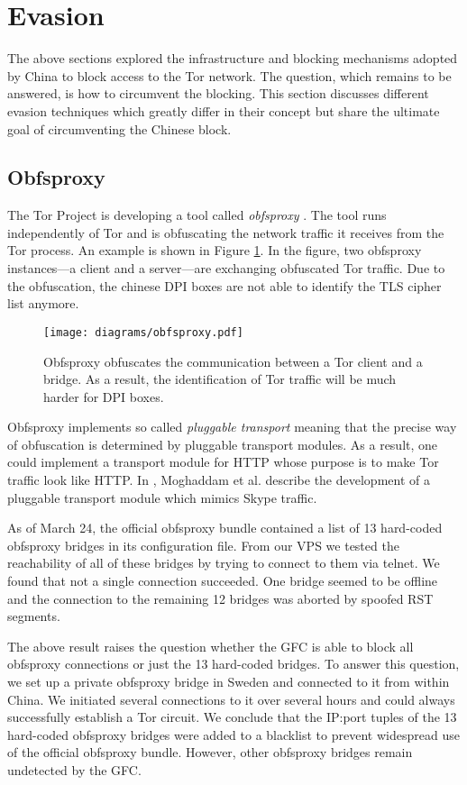 \documentclass[runningheads,a4paper]{llncs}
\begin{document}
\section{Evasion}
\label{sec:evasion}
The above sections explored the infrastructure and blocking mechanisms adopted by China to block
access to the Tor network. The question, which remains to be answered, is how to circumvent the
blocking. This section discusses different evasion techniques which greatly differ in their concept
but share the ultimate goal of circumventing the Chinese block.

\subsection{Obfsproxy}
The Tor Project is developing a tool called \emph{obfsproxy} \cite{obfsproxy}. The tool runs
independently of Tor and is obfuscating the network traffic it receives from the Tor process. An
example is shown in Figure \ref{fig:obfsproxy}. In the figure, two obfsproxy instances---a client
and a server---are exchanging obfuscated Tor traffic. Due to the obfuscation, the chinese DPI boxes
are not able to identify the TLS cipher list anymore.

\begin{figure}
\centering
\texttt{[image: diagrams/obfsproxy.pdf]}
\caption{Obfsproxy obfuscates the communication between a Tor client and a bridge. As a result, the
identification of Tor traffic will be much harder for DPI boxes.}
\label{fig:obfsproxy}
\end{figure}

Obfsproxy implements so called \emph{pluggable transport} meaning that the precise way of
obfuscation is determined by pluggable transport modules. As a result, one could implement a
transport module for HTTP whose purpose is to make Tor traffic look like HTTP. In
\cite{Moghaddam2012}, Moghaddam et al. describe the development of a pluggable transport module
which mimics Skype traffic.

As of March 24, the official obfsproxy bundle \cite{obfsproxy} contained a list of 13 hard-coded
obfsproxy bridges in its configuration file. From our VPS we tested the reachability of all of these
bridges by trying to connect to them via telnet. We found that not a single connection succeeded.
One bridge seemed to be offline and the connection to the remaining 12 bridges was aborted by
spoofed RST segments.

The above result raises the question whether the GFC is able to block all obfsproxy connections or
just the 13 hard-coded bridges. To answer this question, we set up a private obfsproxy bridge in
Sweden and connected to it from within China. We initiated several connections to it over
several hours and could always successfully establish a Tor circuit. We conclude that the IP:port
tuples of the 13 hard-coded obfsproxy bridges were added to a blacklist to prevent widespread use of
the official obfsproxy bundle. However, other obfsproxy bridges remain undetected by the GFC.
\end{document}
